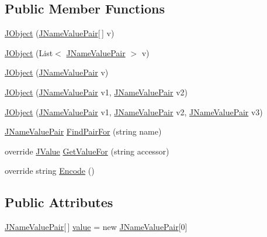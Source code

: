 \subsection*{Public Member Functions}
\begin{DoxyCompactItemize}
\item 
\hyperlink{class_disruptive_software_1_1_j_object_a9e2cce2869edaa2f074d309d95254781}{J\+Object} (\hyperlink{class_disruptive_software_1_1_j_name_value_pair}{J\+Name\+Value\+Pair}\mbox{[}$\,$\mbox{]} v)
\item 
\hyperlink{class_disruptive_software_1_1_j_object_a7d5db4177716c034080c64e9a88fa268}{J\+Object} (List$<$ \hyperlink{class_disruptive_software_1_1_j_name_value_pair}{J\+Name\+Value\+Pair} $>$ v)
\item 
\hyperlink{class_disruptive_software_1_1_j_object_adc69ccb5b1b7eebab266a5221f7efe9d}{J\+Object} (\hyperlink{class_disruptive_software_1_1_j_name_value_pair}{J\+Name\+Value\+Pair} v)
\item 
\hyperlink{class_disruptive_software_1_1_j_object_a2f1d8d111316bb46c3bc3d7a915fdb29}{J\+Object} (\hyperlink{class_disruptive_software_1_1_j_name_value_pair}{J\+Name\+Value\+Pair} v1, \hyperlink{class_disruptive_software_1_1_j_name_value_pair}{J\+Name\+Value\+Pair} v2)
\item 
\hyperlink{class_disruptive_software_1_1_j_object_a585f360f9c60b2e973205ecd08506aae}{J\+Object} (\hyperlink{class_disruptive_software_1_1_j_name_value_pair}{J\+Name\+Value\+Pair} v1, \hyperlink{class_disruptive_software_1_1_j_name_value_pair}{J\+Name\+Value\+Pair} v2, \hyperlink{class_disruptive_software_1_1_j_name_value_pair}{J\+Name\+Value\+Pair} v3)
\item 
\hyperlink{class_disruptive_software_1_1_j_name_value_pair}{J\+Name\+Value\+Pair} \hyperlink{class_disruptive_software_1_1_j_object_af8f7b1349b1275e43695bd5776f98965}{Find\+Pair\+For} (string name)
\item 
override \hyperlink{class_disruptive_software_1_1_j_value}{J\+Value} \hyperlink{class_disruptive_software_1_1_j_object_ac848a27f4f66e218420208ff0da86ccb}{Get\+Value\+For} (string accessor)
\item 
override string \hyperlink{class_disruptive_software_1_1_j_object_a42f65eb1e09784ce5f782f8800ffc7fa}{Encode} ()
\end{DoxyCompactItemize}
\subsection*{Public Attributes}
\begin{DoxyCompactItemize}
\item 
\hyperlink{class_disruptive_software_1_1_j_name_value_pair}{J\+Name\+Value\+Pair}\mbox{[}$\,$\mbox{]} \hyperlink{class_disruptive_software_1_1_j_object_a2f73fcc40679097b08e03b01ba345e4f}{value} = new \hyperlink{class_disruptive_software_1_1_j_name_value_pair}{J\+Name\+Value\+Pair}\mbox{[}0\mbox{]}
\end{DoxyCompactItemize}
